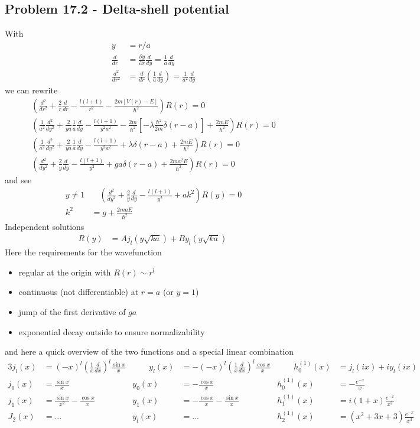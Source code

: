 \documentclass[10pt,a4paper]{book}
\theoremstyle{definition}
\begin{document}
\subsection{Problem 17.2 - Delta-shell potential}
With
\begin{align}
y&=r/a\\
\frac{d}{dr}&=\frac{\partial y}{\partial r}\frac{d}{dy}=\frac{1}{a}\frac{d}{dy}\\
\frac{d^2}{dr^2}&=\frac{d}{dr}\left(\frac{1}{a}\frac{d}{dy}\right)=\frac{1}{a^2}\frac{d}{dy}
\end{align}
we can rewrite
\begin{align}
\left(\frac{d^2}{dr^2}+\frac{2}{r}\frac{d}{dr}-\frac{l(l+1)}{r^2}-\frac{2m[V(r)-E]}{\hbar^2}\right)R(r)=0\\
\left(\frac{1}{a^2}\frac{d^2}{dy^2}+\frac{2}{ya}\frac{1}{a}\frac{d}{dy}-\frac{l(l+1)}{y^2a^2}-\frac{2m}{\hbar^2}\left[-\lambda\frac{\hbar^2}{2m}\delta(r-a)\right]+\frac{2mE}{\hbar^2}\right)R(r)=0\\
\left(\frac{1}{a^2}\frac{d^2}{dy^2}+\frac{2}{ya}\frac{1}{a}\frac{d}{dy}-\frac{l(l+1)}{y^2a^2}+\lambda\delta(r-a)+\frac{2mE}{\hbar^2}\right)R(r)=0\\
\left(\frac{d^2}{dy^2}+\frac{2}{y}\frac{d}{dy}-\frac{l(l+1)}{y^2}+ga\delta(r-a)+\frac{2ma^2E}{\hbar^2}\right)R(r)=0
\end{align}
and see
\begin{align}
y\neq1&\quad \left(\frac{d^2}{dy^2}+\frac{2}{y}\frac{d}{dy}-\frac{l(l+1)}{y^2}+ak^2\right)R(y)=0\\
k^2&=g+\frac{2maE}{\hbar^2}
\end{align}
Independent solutions
\begin{align}
R(y)
&=Aj_l(y\sqrt{ka})+By_l(y\sqrt{ka})\
\end{align}
Here the requirements for the wavefunction
\begin{itemize}
\item regular at the origin with $R(r)\sim r^l$
\item continuous (not differentiable) at $r=a$ (or $y=1$)
\item jump of the first derivative of $ga$
\item exponential decay outside to ensure normalizability
\end{itemize}
and here a quick overview of the two functions and a special linear combination
\begin{alignat*}{3}
j_l(x)&=(-x)^l\left(\frac{1}{x}\frac{d}{dx}\right)^l\frac{\sin x}{x} & \qquad y_l(x)&=-(-x)^l\left(\frac{1}{x}\frac{d}{dx}\right)^l\frac{\cos x}{x} &\qquad  h^{(1)}_0(x)&=j_l(ix)+iy_l(ix)\\
j_0(x)&=\frac{\sin x}{x}                                             & y_0(x)&=-\frac{\cos x}{x}                    & h^{(1)}_0(x)&=-\frac{e^{-x}}{x}\\
j_1(x)&=\frac{\sin x}{x^2}-\frac{\cos x}{x}                          & y_1(x)&=-\frac{\cos x}{x}-\frac{\sin x}{x}   & h^{(1)}_1(x)&=i(1+x)\frac{e^{-x}}{x^2}\\
J_2(x)&=...                                                          & y_l(x)&=...                                  & h^{(1)}_2(x)&=(x^2+3x+3)\frac{e^{-x}}{x^3} 
\end{alignat*} 
\end{document}
